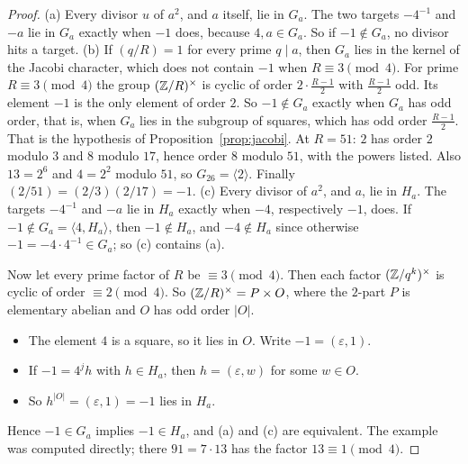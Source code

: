 \begin{proof}
(a) Every divisor $u$ of $a^2$, and $a$ itself, lie in $G_a$. The two targets $-4^{-1}$ and $-a$ lie in $G_a$ exactly when $-1$ does, because $4,a\in G_a$. So if $-1\notin G_a$, no divisor hits a target.
(b) If $(q/R)=1$ for every prime $q\mid a$, then $G_a$ lies in the kernel of the Jacobi character, which does not contain $-1$ when $R\equiv3\pmod4$. For prime $R\equiv3\pmod4$ the group $(\mathbb{Z}/R)^\times$ is cyclic of order $2\cdot\frac{R-1}2$ with $\frac{R-1}2$ odd. Its element $-1$ is the only element of order $2$. So $-1\notin G_a$ exactly when $G_a$ has odd order, that is, when $G_a$ lies in the subgroup of squares, which has odd order $\frac{R-1}2$. That is the hypothesis of Proposition~\ref{prop:jacobi}. At $R=51$: $2$ has order $2$ modulo $3$ and $8$ modulo $17$, hence order $8$ modulo $51$, with the powers listed. Also $13=2^6$ and $4=2^2$ modulo $51$, so $G_{26}=\langle2\rangle$. Finally $(2/51)=(2/3)(2/17)=-1$.
(c) Every divisor of $a^2$, and $a$, lie in $H_a$. The targets $-4^{-1}$ and $-a$ lie in $H_a$ exactly when $-4$, respectively $-1$, does. If $-1\notin G_a=\langle4,H_a\rangle$, then $-1\notin H_a$, and $-4\notin H_a$ since otherwise $-1=-4\cdot4^{-1}\in G_a$; so (c) contains (a).

Now let every prime factor of $R$ be $\equiv3\pmod4$. Then each factor $(\mathbb{Z}/q^k)^\times$ is cyclic of order $\equiv2\pmod4$. So $(\mathbb{Z}/R)^\times=P\times O$, where the $2$-part $P$ is elementary abelian and $O$ has odd order $|O|$.
\begin{itemize}
\item The element $4$ is a square, so it lies in $O$. Write $-1=(\varepsilon,1)$.
\item If $-1=4^jh$ with $h\in H_a$, then $h=(\varepsilon,w)$ for some $w\in O$.
\item So $h^{|O|}=(\varepsilon,1)=-1$ lies in $H_a$.
\end{itemize}
Hence $-1\in G_a$ implies $-1\in H_a$, and (a) and (c) are equivalent. The example was computed directly; there $91=7\cdot13$ has the factor $13\equiv1\pmod4$.
\end{proof}

